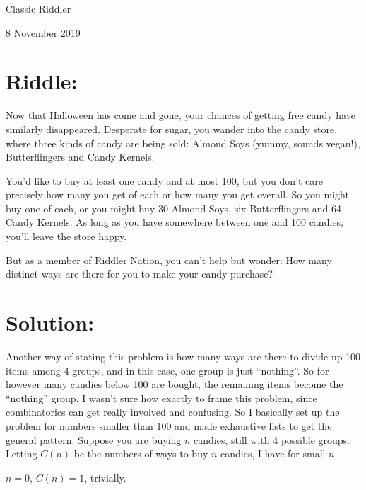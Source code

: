 \documentclass{article}
\begin{document}
\pagestyle{empty} %

\begin{center}
{\LARGE Classic Riddler}

\vspace{0.15in}

{\Large 8 November 2019}
\end{center}


\section*{Riddle:}

Now that Halloween has come and gone, your chances of getting free candy have similarly disappeared.
Desperate for sugar, you wander into the candy store, where three kinds of candy are being sold: Almond Soys (yummy, sounds vegan!), Butterflingers and Candy Kernels.

You'd like to buy at least one candy and at most 100, but you don't care precisely how many you get of each or how many you get overall.
So you might buy one of each, or you might buy 30 Almond Soys, six Butterflingers and 64 Candy Kernels.
As long as you have somewhere between one and 100 candies, you'll leave the store happy.

But as a member of Riddler Nation, you can't help but wonder: How many distinct ways are there for you to make your candy purchase?


\section*{Solution:}

Another way of stating this problem is how many ways are there to divide up 100 items among 4 groups, and in this case, one group is just ``nothing''.
So for however many candies below 100 are bought, the remaining items become the ``nothing'' group.
I wasn't sure how exactly to frame this problem, since combinatorics can get really involved and confusing.
So I basically set up the problem for numbers smaller than 100 and made exhaustive lists to get the general pattern.
Suppose you are buying $n$ candies, still with 4 possible groups.
Letting $C(n)$ be the numbers of ways to buy $n$ candies, I have for small $n$

\vspace{0.2in}

$n=0$, $C(n)=1$, trivially.

\vspace{0.2in}
\end{document}
